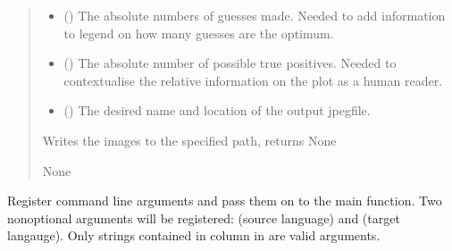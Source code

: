 \documentclass[letterpaper,10pt,english]{sphinxmanual}
\begin{document}
{{{{\begin{fulllineitems}
\begin{quote}
\begin{description}
\begin{itemize}
\item {} 
\sphinxAtStartPar
{} () \textendash{} The absolute numbers of guesses made. Needed to add
information to legend on how many guesses are the optimum.

\item {} 
\sphinxAtStartPar
{} () \textendash{} The absolute number of possible true positives. Needed to
contextualise the relative information on the plot as a
human reader.

\item {} 
\sphinxAtStartPar
{} () \textendash{} The desired name and location of the output jpeg\sphinxhyphen{}file.

\end{itemize}

\sphinxAtStartPar
Writes the images to the specified path, returns None

\sphinxAtStartPar
None

\end{description}\end{quote}

\end{fulllineitems}


\begin{fulllineitems}
\label{\detokenize{mkloanpy:ronataswestoldturkiccommands.plot_eval.register}}
\pysigstartsignatures
{}
\pysigstopsignatures
\sphinxAtStartPar
Register command line arguments and pass them on to the main function.
Two non\sphinxhyphen{}optional arguments will be registered:
 (source language) and  (target langauge).
Only strings contained in column  in  are valid
arguments.


\end{fulllineitems}}}}}
\end{document}
